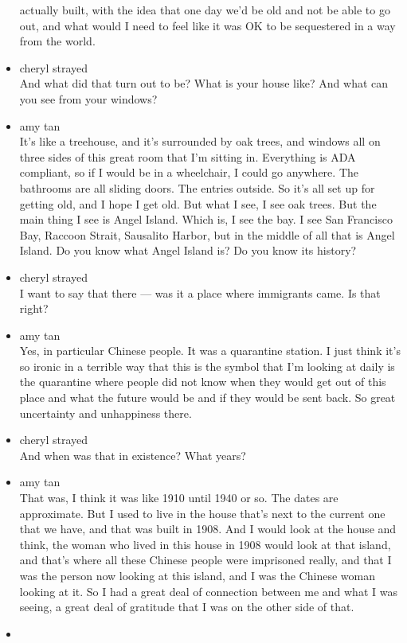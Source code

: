 \begin{itemize}
  actually built, with the idea that one day we'd be old and not be able
  to go out, and what would I need to feel like it was OK to be
  sequestered in a way from the world.
\item
  cheryl strayed\\
  And what did that turn out to be? What is your house like? And what
  can you see from your windows?
\item
  amy tan\\
  It's like a treehouse, and it's surrounded by oak trees, and windows
  all on three sides of this great room that I'm sitting in. Everything
  is ADA compliant, so if I would be in a wheelchair, I could go
  anywhere. The bathrooms are all sliding doors. The entries outside. So
  it's all set up for getting old, and I hope I get old. But what I see,
  I see oak trees. But the main thing I see is Angel Island. Which is, I
  see the bay. I see San Francisco Bay, Raccoon Strait, Sausalito
  Harbor, but in the middle of all that is Angel Island. Do you know
  what Angel Island is? Do you know its history?
\item
  cheryl strayed\\
  I want to say that there --- was it a place where immigrants came. Is
  that right?
\item
  amy tan\\
  Yes, in particular Chinese people. It was a quarantine station. I just
  think it's so ironic in a terrible way that this is the symbol that
  I'm looking at daily is the quarantine where people did not know when
  they would get out of this place and what the future would be and if
  they would be sent back. So great uncertainty and unhappiness there.
\item
  cheryl strayed\\
  And when was that in existence? What years?
\item
  amy tan\\
  That was, I think it was like 1910 until 1940 or so. The dates are
  approximate. But I used to live in the house that's next to the
  current one that we have, and that was built in 1908. And I would look
  at the house and think, the woman who lived in this house in 1908
  would look at that island, and that's where all these Chinese people
  were imprisoned really, and that I was the person now looking at this
  island, and I was the Chinese woman looking at it. So I had a great
  deal of connection between me and what I was seeing, a great deal of
  gratitude that I was on the other side of that.
\item

\end{itemize}
